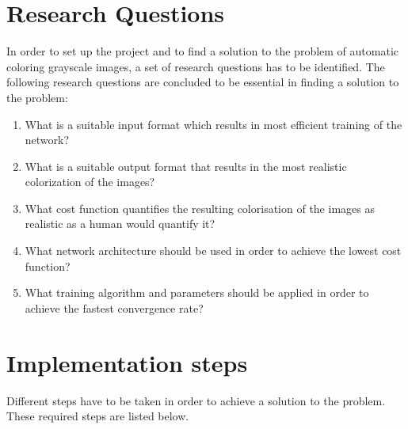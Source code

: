\section{Research Questions}

In order to set up the project and to find a solution to the problem of automatic coloring grayscale images, a set of research questions has to be identified. The following research questions are concluded to be essential in finding a solution to the problem:

\begin{enumerate}
	\item {What is a suitable input format which results in most efficient training of the network?}
	\item {What is a suitable output format that results in the most realistic colorization of the images?}
	\item {What cost function quantifies the resulting colorisation of the images as realistic as a human would quantify it?}
	\item {What network architecture should be used in order to achieve the lowest cost function?}
	\item {What training algorithm and parameters should be applied in order to achieve the fastest convergence rate?}
\end{enumerate}

\section{Implementation steps}
	
Different steps have to be taken in order to achieve a solution to the problem. These required steps are listed below.

